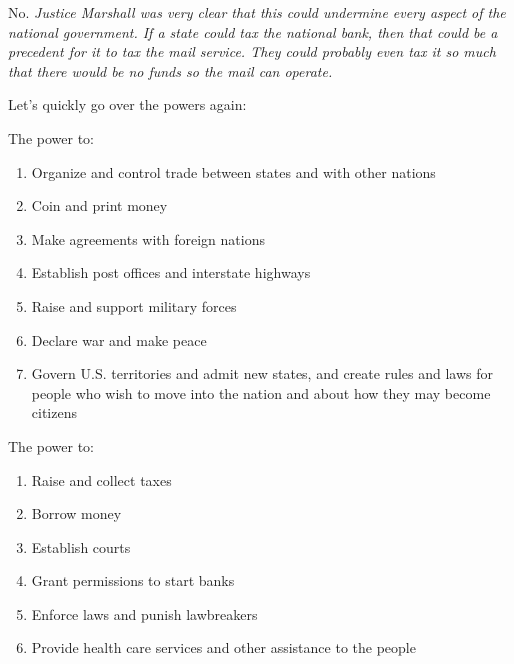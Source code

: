\begin{answer}
    No. \it{Justice Marshall} was very clear that this could undermine every aspect of the national government. If a state could tax the national bank, then that could be a precedent for it to tax the mail service. They could probably even tax it so much that there would be no funds so the mail can operate.
\end{answer}

Let's quickly go over the powers again:

\begin{definition}
    The power to:
    
    \begin{enumerate}
        \item Organize and control trade between states and with other nations
        \item Coin and print money
        \item Make agreements with foreign nations
        \item Establish post offices and interstate highways
        \item Raise and support military forces
        \item Declare war and make peace
        \item Govern U.S. territories and admit new states, and create rules and laws for people who wish to move into the nation and about how they may become citizens
    \end{enumerate}
\end{definition}

\begin{definition}
    The power to:
        
    \begin{enumerate}
        \item Raise and collect taxes
        \item Borrow money
        \item Establish courts
        \item Grant permissions to start banks
        \item Enforce laws and punish lawbreakers
        \item Provide health care services and other assistance to the people
    \end{enumerate}
\end{definition}    


